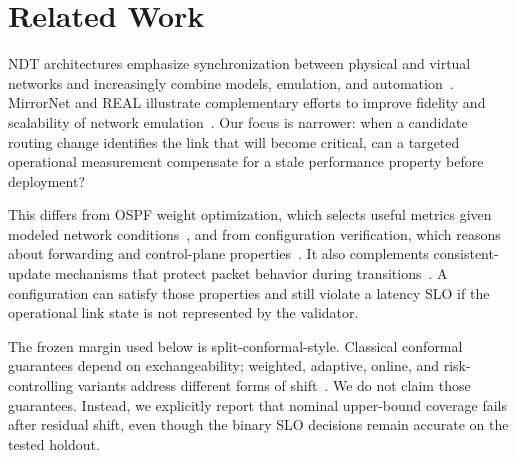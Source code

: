 \section{Related Work}

NDT architectures emphasize synchronization between physical and virtual networks and increasingly combine models, emulation, and automation~\cite{almasan2022ndt,hui2022digital,abenathar2025route,auge2026aether,wu2026agentndt}. MirrorNet and REAL illustrate complementary efforts to improve fidelity and scalability of network emulation~\cite{miao2026mirrornet,xia2026real}. Our focus is narrower: when a candidate routing change identifies the link that will become critical, can a targeted operational measurement compensate for a stale performance property before deployment?

This differs from OSPF weight optimization, which selects useful metrics given modeled network conditions~\cite{fortz2000ospf}, and from configuration verification, which reasons about forwarding and control-plane properties~\cite{fogel2015analysis,beckett2017verification,prabhu2020plankton}. It also complements consistent-update mechanisms that protect packet behavior during transitions~\cite{reitblatt2012updates}. A configuration can satisfy those properties and still violate a latency SLO if the operational link state is not represented by the validator.

The frozen margin used below is split-conformal-style. Classical conformal guarantees depend on exchangeability; weighted, adaptive, online, and risk-controlling variants address different forms of shift~\cite{tibshirani2019covariate,gibbs2021adaptive,gibbs2024online,bates2021risk}. We do not claim those guarantees. Instead, we explicitly report that nominal upper-bound coverage fails after residual shift, even though the binary SLO decisions remain accurate on the tested holdout.
